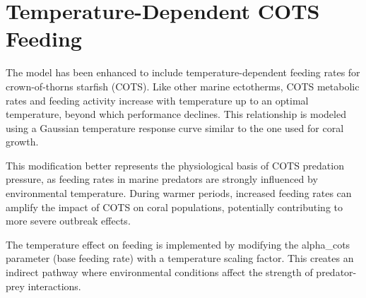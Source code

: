 \section{Temperature-Dependent COTS Feeding}

The model has been enhanced to include temperature-dependent feeding rates for crown-of-thorns starfish (COTS). Like other marine ectotherms, COTS metabolic rates and feeding activity increase with temperature up to an optimal temperature, beyond which performance declines. This relationship is modeled using a Gaussian temperature response curve similar to the one used for coral growth.

This modification better represents the physiological basis of COTS predation pressure, as feeding rates in marine predators are strongly influenced by environmental temperature. During warmer periods, increased feeding rates can amplify the impact of COTS on coral populations, potentially contributing to more severe outbreak effects.

The temperature effect on feeding is implemented by modifying the alpha_cots parameter (base feeding rate) with a temperature scaling factor. This creates an indirect pathway where environmental conditions affect the strength of predator-prey interactions.
